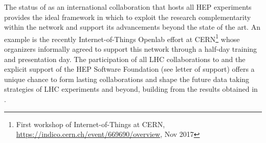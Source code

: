 The status of \cernentity as an international collaboration that hosts all HEP experiments provides the ideal framework in which to exploit the research complementarity within the network and support its 
advancements beyond the state of the art. An example is the recently Internet-of-Things Openlab effort at CERN\footnote{First workshop of Internet-of-Things at CERN, \url{https://indico.cern.ch/event/669690/overview}, Nov 2017} whose organizers informally agreed to support this network through a half-day training and presentation day. 
The participation of all LHC collaborations to \acronym and the explicit support of the HEP Software Foundation (see letter of support) offers a unique chance to form lasting collaborations and shape the future data taking strategies of LHC experiments and beyond, building from the  results obtained in \acronym.  







%
%
%
%
%
%

